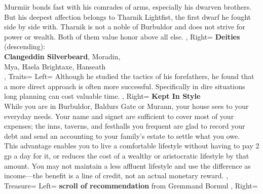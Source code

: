 \documentclass[10pt,a4paper]{scrbook}
\begin{document}
{{{				%
				Murmiir bonds fast with his comrades of arms, especially his dwarven brothers.
				But his deepest affection belongs to Tharnik Lightfist, the first dwarf he fought side by side with.
				Tharnik is not a noble of Burbuldor and does not strive for power or wealth.
				Both of them value honor above all else.
			},
			Right={
				\textbf{Deities} (descending):\\
				\textbf{Clangeddin Silverbeard}, Moradin,\\
				Mya, Haela Brightaxe, Hanseath\\
			}
		},
		Traits={
			Left={
				Although he studied the tactics of his forefathers, he found that a more direct approach is often more successful.
				Specifically in dire situations long planning can cost valuable time.
			},
			Right={
				\textbf{Kept In Style}\\
				While you are in Burbuldor, Baldurs Gate or Murann, your house sees to your everyday needs. Your name and signet are sufficient to cover most of your expenses; the inns, taverns, and festhalls you frequent are glad to record your debt and send an accounting to your family's estate to settle what you owe.\\
				This advantage enables you to live a comfortable lifestyle without having to pay 2 gp a day for it, or reduces the cost of a wealthy or aristocratic lifestyle by that amount. You may not maintain a less affluent lifestyle and use the difference as income—the benefit is a line of credit, not an actual monetary reward.
			}
		},
		Treasure={
			Left={
				\textbf{scroll of recommendation} from Gremmand Bormul
			},
			Right={
			}
		}
	}

\end{document}
